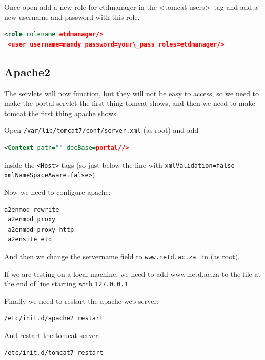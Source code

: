 \documentclass[a4paper,11pt]{article}
\begin{document}
Once open add a new role for etdmanager in the \textless tomcat-users\textgreater \, tag and add a new username and password with this role. 

\begin{lstlisting}[language=XML]
 <role rolename=etdmanager/> 
 <user username=mandy password=your\_pass roles=etdmanager/>
\end{lstlisting}

\subsection{Apache2}

The servlets will now function, but they will not be easy to access, so we need to make the portal servlet the first thing tomcat shows, and then we need to make tomcat the first thing apache shows.

Open \texttt{/var/lib/tomcat7/conf/server.xml} (as root) and add 

\begin{lstlisting}[language=XML]
 <Context path="" docBase=portal//> 
\end{lstlisting}

inside the \texttt{<Host>} tags (so just below the line with \texttt{xmlValidation=false xmlNameSpaceAware=false>})

Now we need to configure apache: 

\begin{lstlisting}[language=bash]
 a2enmod rewrite 
 a2enmod proxy 
 a2enmod proxy_http 
 a2ensite etd
\end{lstlisting}

And then we change the servername field to \texttt{www.netd.ac.za } in  (as root).

If we are testing on a local machine, we need to add www.netd.ac.za to the  file at the end of line starting with \texttt{127.0.0.1}.

Finally we need to restart the apache web server: 

\begin{lstlisting}[language=bash]
 /etc/init.d/apache2 restart
\end{lstlisting}

And restart the tomcat server: 

\begin{lstlisting}[language=bash]
 /etc/init.d/tomcat7 restart
\end{lstlisting}
\end{document}
